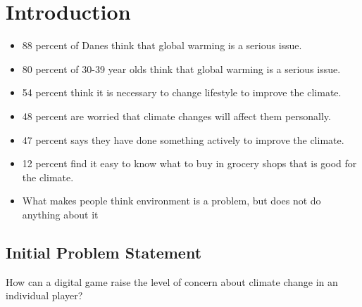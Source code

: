\chapter{Introduction}\label{chap:introduction}








\begin{itemize}
    \item 88 percent of Danes think that global warming is a serious issue\cite{concito}.
    \item 80 percent of 30-39 year olds think that global warming is a serious issue\cite{concito}.
    \item 54 percent think it is necessary to change lifestyle to improve the climate\cite{concito}.
    \item 48 percent are worried that climate changes will affect them personally\cite{concito}.
    \item 47 percent says they have done something actively to improve the climate\cite{concito}.
    \item 12 percent find it easy to know what to buy in grocery shops that is good for the climate\cite{concito}.
    \item What makes people think environment is a problem, but does not do anything about it
\end{itemize}

\section{Initial Problem Statement}
    How can a digital game raise the level of concern about climate change in an individual player?
    
    